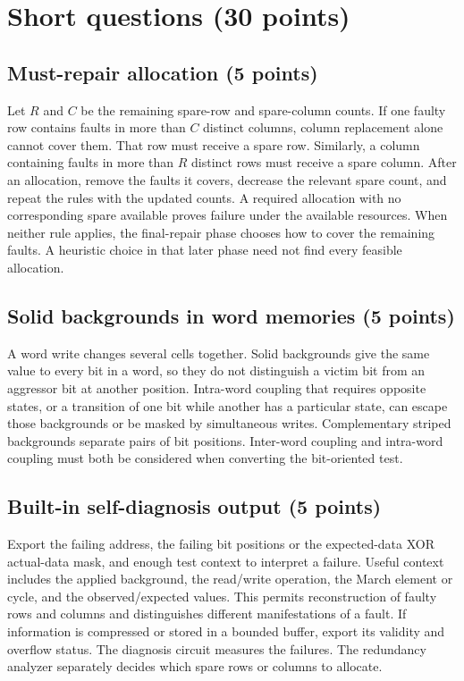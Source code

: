 \section{Short questions (30 points)}
\subsection{Must-repair allocation (5 points)}
\answer Let $R$ and $C$ be the remaining spare-row and spare-column counts. If one faulty row contains faults in more than $C$ distinct columns, column replacement alone cannot cover them. That row must receive a spare row. Similarly, a column containing faults in more than $R$ distinct rows must receive a spare column. After an allocation, remove the faults it covers, decrease the relevant spare count, and repeat the rules with the updated counts. A required allocation with no corresponding spare available proves failure under the available resources. When neither rule applies, the final-repair phase chooses how to cover the remaining faults. A heuristic choice in that later phase need not find every feasible allocation.

\subsection{Solid backgrounds in word memories (5 points)}
\answer A word write changes several cells together. Solid backgrounds give the same value to every bit in a word, so they do not distinguish a victim bit from an aggressor bit at another position. Intra-word coupling that requires opposite states, or a transition of one bit while another has a particular state, can escape those backgrounds or be masked by simultaneous writes. Complementary striped backgrounds separate pairs of bit positions. Inter-word coupling and intra-word coupling must both be considered when converting the bit-oriented test.

\subsection{Built-in self-diagnosis output (5 points)}
\answer Export the failing address, the failing bit positions or the expected-data XOR actual-data mask, and enough test context to interpret a failure. Useful context includes the applied background, the read/write operation, the March element or cycle, and the observed/expected values. This permits reconstruction of faulty rows and columns and distinguishes different manifestations of a fault. If information is compressed or stored in a bounded buffer, export its validity and overflow status. The diagnosis circuit measures the failures. The redundancy analyzer separately decides which spare rows or columns to allocate.

